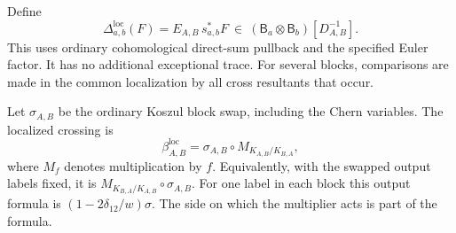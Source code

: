 Define
\begin{equation}\label{gh:localized-coproduct}
 \Delta^{\mathrm{loc}}_{a,b}(F)
   =E_{A,B}\,s_{a,b}^*F
   \ \in\
   (\mathsf B_a\otimes\mathsf B_b)[D_{A,B}^{-1}].
\end{equation}
This uses ordinary cohomological direct-sum pullback and the
specified Euler factor. It has no additional exceptional trace.
For several blocks, comparisons are made in the common
localization by all cross resultants that occur.

Let $\sigma_{A,B}$ be the ordinary Koszul block swap, including
the Chern variables. The localized crossing is
\begin{equation}\label{gh:localized-crossing}
 \beta^{\mathrm{loc}}_{A,B}
    =\sigma_{A,B}\circ M_{K_{A,B}/K_{B,A}},
\end{equation}
where $M_f$ denotes multiplication by $f$.
Equivalently, with the swapped output labels fixed, it is
$M_{K_{B,A}/K_{A,B}}\circ\sigma_{A,B}$.
For one label in each block this output formula is
$(1-2\delta_{12}/w)\sigma$.
The side on which the multiplier acts is part of the formula.

